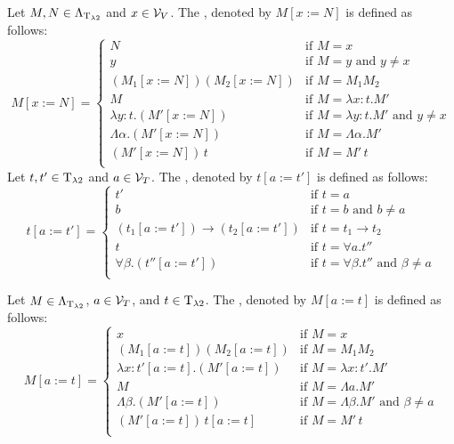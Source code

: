 \begin{definition}\label{def.2.2}
	Let $M,N\in\Lambda_{\text{T}_{\lambda2}}$ and $x\in\mathcal{V}_V$. The , denoted by $M\left[x:=N\right]$ is defined as follows:
	\[M\left[x:=N\right]=
		\begin{cases}
			N                     & \text{if $M=x$}                \\
			y                     & \text{if $M=y$ and $y\neq x$}  \\
			(M_1\left[x:=N\right])(M_2\left[x:=N\right])  & \text{if $M=M_1M_2$}           \\
			M                     & \text{if $M=\lambda x:t.M'$}   \\
			\lambda y:t.(M'\left[x:=N\right])             & \text{if $M=\lambda y:t.M'$ and $y\neq x$}   \\
			\Lambda\alpha.(M'\left[x:=N\right])           & \text{if $M=\Lambda\alpha.M'$} \\
			(M'\left[x:=N\right])\,t                      & \text{if $M=M'\,t$}            \\
		\end{cases}\]
	Let $t,t'\in\text{T}_{\lambda2}$ and $a\in\mathcal{V}_T$. The , denoted by $t\left[a:=t'\right]$ is defined as follows:
	\[t\left[a:=t'\right]=
		\begin{cases}
			t'                    & \text{if $t=a$}                    \\ 
			b                     & \text{if $t=b$ and $b\neq a$}      \\ 
			(t_1\left[a:=t'\right])\to (t_2\left[a:=t'\right])  & \text{if $t=t_1\to t_2$}           \\
			t & \text{if $t=\forall a.t''$}\\
			\forall\beta.(t''\left[a:=t'\right]) & \text{if $t=\forall\beta.t''$ and $\beta\neq a$}\\
		\end{cases}\]
		
	Let $M\in\Lambda_{\text{T}_{\lambda2}}$, $a\in\mathcal{V}_T$, and $t\in\text{T}_{\lambda2}$. The , denoted by $M\left[a:=t\right]$ is defined as follows:
	\[M\left[a:=t\right]=
		\begin{cases}
			x                                             & \text{if $M=x$}  \\
			(M_1\left[a:=t\right])(M_2\left[a:=t\right])  & \text{if $M=M_1M_2$}           \\
			\lambda x:t'\left[a:=t\right].(M'\left[a:=t\right])             & \text{if $M=\lambda x:t'.M'$}   \\
			M                                             & \text{if $M=\Lambda a.M'$} \\
			\Lambda\beta.(M'\left[a:=t\right])           & \text{if $M=\Lambda\beta.M'$ and $\beta\neq a$} \\
			(M'\left[a:=t\right])\,t\left[a:=t\right]     & \text{if $M=M'\,t$}            \\
		\end{cases}\]
\end{definition}

